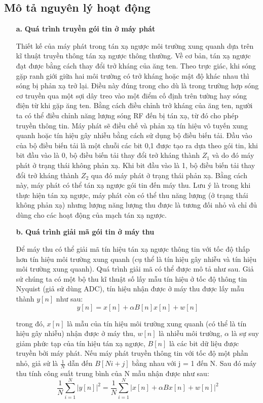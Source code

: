 \documentclass{uetgraduation}
\begin{document}
\subsection{Mô tả nguyên lý hoạt động}
\begin{enumerate}
    \item [\textbf{a.}] \textbf{Quá trình truyền gói tin ở máy phát}
    
    Thiết kế của máy phát trong tán xạ ngược môi trường xung quanh dựa trên kĩ thuật truyền thông tán xạ ngược thông thường. Về cơ bản, tán xạ ngược đạt được bằng cách thay đổi
    trở kháng của ăng ten. Theo trực giác, khi sóng gặp ranh giới giữa hai môi trường có trở kháng hoặc mật độ khác nhau thì sóng bị phản xạ trở lại. Điều này đúng trong cho dù
    là trong trường hợp sóng cơ truyền qua một sợi dây treo vào một điểm cố định trên tường hay sóng điện từ khi gặp ăng ten. Bằng cách điều chỉnh trở kháng của ăng ten, người ta
    có thể điều chỉnh năng lượng sóng RF đến bị tán xạ, từ đó cho phép truyền thông tin. Máy phát sẽ điều chế và phản xạ tín hiệu vô tuyến xung quanh hoặc tín hiệu gây nhiễu bằng
    cách sử dụng bộ điều biến tải. Đầu vào của bộ điều biến tải là một chuỗi các bit 0,1 được tạo ra dựa theo gói tin, khi bit đầu vào là 0, bộ điều biến tải thay đổi trở kháng
    thành $Z_1$ và do đó máy phát ở trạng thái không phản xạ. Khi bit đầu vào là 1, bộ điều biến tải thay đổi trở kháng thành $Z_2$ qua đó máy phát ở trạng thái phản xạ. Bằng cách
    này, máy phát có thể tán xạ ngược gói tin đến máy thu. Lưu ý là trong khi thực hiện tán xạ ngược, máy phát còn có thể thu năng lượng (ở trạng thái không phản xạ) nhưng lượng
    năng lượng thu được là tương đối nhỏ và chỉ đủ dùng cho các hoạt động của mạch tán xạ ngược.
    
    \item [\textbf{b.}] \textbf{Quá trình giải mã gói tin ở máy thu}
    
    Để máy thu có thể giải mã tín hiệu tán xạ ngược thông tin với tốc độ thấp hơn tín hiệu môi trường xung quanh (cụ thể là tín hiệu gây nhiễu và tín hiệu môi trường xung quanh).
    Quá trình giải mã có thể được mô tả như sau. Giả sử chúng ta có một bộ thu kĩ thuật số lấy mẫu tín hiệu ở tốc độ thông tin Nyquist (giả sử dùng ADC), tín hiệu nhận được ở máy thu được lấy mẫu
    thành $y[n]$ như sau:
    \begin{equation}
        y[n] = x[n] + \alpha B[n]x[n] + w[n]
        \label{eq:}
    \end{equation}
    
    trong đó, $x[n]$ là mẫu của tín hiệu môi trường xung quanh (có thể là tín hiệu gây nhiễu) nhận được ở máy thu, $w[n]$ là nhiễu môi trường, $\alpha$ là sự suy giảm phức tạp của
    tín hiệu tán xạ ngược, $B[n]$ là các bit dữ liệu được truyền bởi máy phát. Nếu máy phát truyền thông tin với tốc độ một phần nhỏ, giả sử là $\frac{1}{N}$ dẫn đến $B[Ni + j]$ bằng
    nhau với j = 1 đến N. Sau đó máy thu tính công suất trung bình của N mẫu nhận được như sau:
    \begin{equation}
        \frac{1}{N}\sum_{i=1}^N|y[n]|^2 = \frac{1}{N}\sum_{i=1}^N|x[n] + \alpha B x[n] + w[n]|^2
    \end{equation}
    

\end{enumerate}
\end{document}
